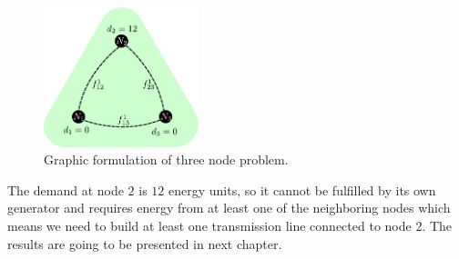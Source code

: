 \begin{figure}[H]
  \begin{center}
\includegraphics[width=0.4\textwidth]{Figures/Green_Initial.pdf}
  \end{center}
  \caption{Graphic formulation of three node problem.}
  \label{fig: Green_inital}
\end{figure}
The demand at node $2$ is $12$ energy units, so it cannot be fulfilled by its own generator and requires energy from at least one of the neighboring nodes which means we need to build at least one transmission line connected to node $2$. The results are going to be presented in next chapter.
